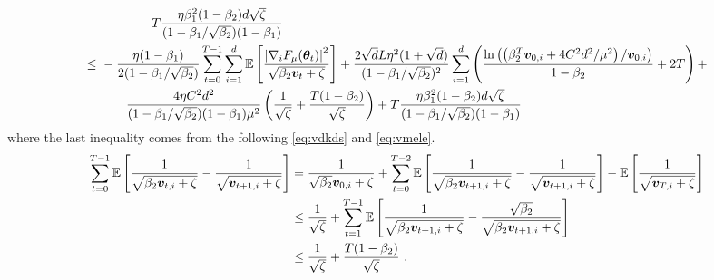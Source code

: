\begin{appendices}
\begin{equation}
\begin{aligned}
&\qquad \qquad T\frac{\eta\beta_1^2(1-\beta_2)d\sqrt{\zeta}}{(1-\beta_1/\sqrt{\beta_2})(1-\beta_1)} \\
\leq\,\,& - \frac{\eta(1-\beta_1)}{2(1-\beta_1/\sqrt{\beta_2})} \sum_{t=0}^{T-1}\sum_{i=1}^d \mathbb{E}\left[\frac{\left|\nabla_i F_{\mu}({\bm{\theta}}_t)\right|^2}{\sqrt{\beta_2{\bm{v}}_{t} + \zeta}}\right] + \frac{2\sqrt{d}L\eta^2(1 + \sqrt{d})}{(1-\beta_1/\sqrt{\beta_2})^2}\sum_{i=1}^d\left(\frac{\ln\left(\left(\beta_2^{T}{\bm{v}}_{0,i} + 4C^2d^2/\mu^2\right)/{\bm{v}}_{0,i}\right)}{1-\beta_2} + 2T\right) + \\
&\qquad  \frac{4\eta C^2d^2}{(1-\beta_1/\sqrt{\beta_2})(1-\beta_1)\mu^2}\left(\frac{1}{\sqrt{\zeta}} + \frac{T(1-\beta_2)}{\sqrt{\zeta}}\right) + T\frac{\eta\beta_1^2(1-\beta_2)d\sqrt{\zeta}}{(1-\beta_1/\sqrt{\beta_2})(1-\beta_1)} \label{eq:jdnvd}
\end{aligned}
\end{equation}
where the last inequality comes from the following \eqref{eq:vdkds} and \eqref{eq:vmele}.
\begin{equation}
\begin{aligned}
\sum_{t=0}^{T-1}\mathbb{E}\left[\frac{1}{\sqrt{\beta_2{\bm{v}}_{t,i} + \zeta}} - \frac{1}{\sqrt{{\bm{v}}_{t+1,i} + \zeta}}\right] &= \frac{1}{\sqrt{\beta_2}{\bm{v}}_{0,i} + \zeta} + \sum_{t=0}^{T-2} \mathbb{E}\left[\frac{1}{\sqrt{\beta_2{\bm{v}}_{t+1,i} + \zeta}} - \frac{1}{\sqrt{{\bm{v}}_{t+1,i} + \zeta}}\right] -\mathbb{E}\left[\frac{1}{\sqrt{{\bm{v}}_{T,i} + \zeta}}\right] \\
&\leq \frac{1}{\sqrt{\zeta}} + \sum_{t=1}^{T-1} \mathbb{E}\left[\frac{1}{\sqrt{\beta_2{\bm{v}}_{t+1,i} + \zeta}} - \frac{\sqrt{\beta_2}}{\sqrt{\beta_2{\bm{v}}_{t+1,i} + \zeta}}\right] \\
&\leq \frac{1}{\sqrt{\zeta}} + \frac{T(1-\beta_2)}{\sqrt{\zeta}} \ . \label{eq:vdkds}
\end{aligned}
\end{equation}


\end{appendices}
